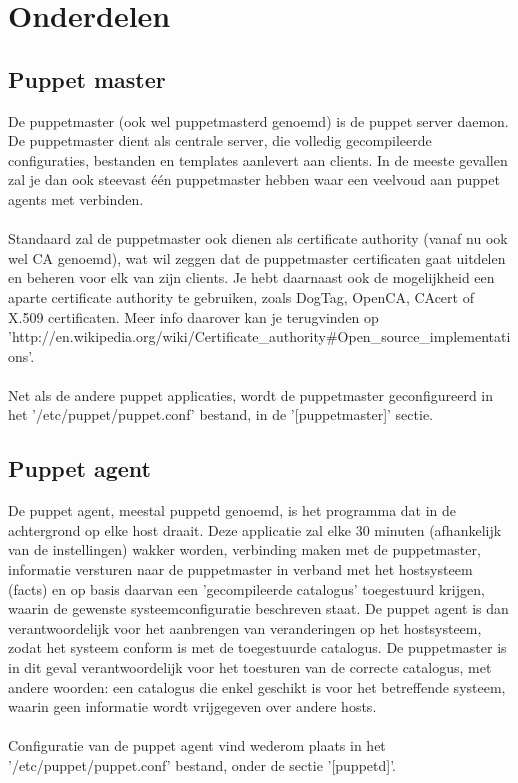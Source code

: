 \section{Onderdelen}

\subsection{Puppet master}
De puppetmaster (ook wel puppetmasterd genoemd) is de puppet server daemon. De puppetmaster dient als centrale server, die volledig gecompileerde configuraties, bestanden en templates aanlevert aan clients. In de meeste gevallen zal je dan ook steevast \'e\'en puppetmaster hebben waar een veelvoud aan puppet agents met verbinden.\\\\
Standaard zal de puppetmaster ook dienen als certificate authority (vanaf nu ook wel CA genoemd), wat wil zeggen dat de puppetmaster certificaten gaat uitdelen en beheren voor elk van zijn clients. Je hebt daarnaast ook de mogelijkheid een aparte certificate authority te gebruiken, zoals DogTag, OpenCA, CAcert of X.509 certificaten. Meer info daarover kan je terugvinden op 'http://en.wikipedia.org/wiki/Certificate\_authority\#Open\_source\_implementations'.\\\\
Net als de andere puppet applicaties, wordt de puppetmaster geconfigureerd in het '/etc/puppet/puppet.conf' bestand, in de '[puppetmaster]' sectie.

\subsection{Puppet agent}
De puppet agent, meestal puppetd genoemd, is het programma dat in de achtergrond op elke host draait. Deze applicatie zal elke 30 minuten (afhankelijk van de instellingen) wakker worden, verbinding maken met de puppetmaster, informatie versturen naar de puppetmaster in verband met het hostsysteem (facts) en op basis daarvan een 'gecompileerde catalogus' toegestuurd krijgen, waarin de gewenste systeemconfiguratie beschreven staat. De puppet agent is dan verantwoordelijk voor het aanbrengen van veranderingen op het hostsysteem, zodat het systeem conform is met de toegestuurde catalogus. De puppetmaster is in dit geval verantwoordelijk voor het toesturen van de correcte catalogus, met andere woorden: een catalogus die enkel geschikt is voor het betreffende systeem, waarin geen informatie wordt vrijgegeven over andere hosts.\\\\
Configuratie van de puppet agent vind wederom plaats in het '/etc/puppet/puppet.conf' bestand, onder de sectie '[puppetd]'.

